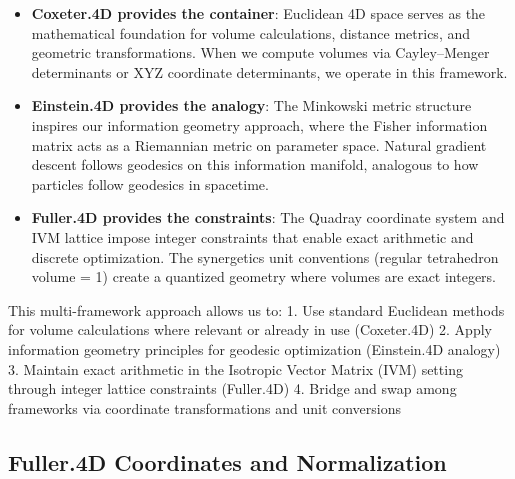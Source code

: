 \documentclass[
  10pt,
]{article}
\begin{document}
\begin{itemize}
\item
  \textbf{Coxeter.4D provides the container}: Euclidean 4D space serves
  as the mathematical foundation for volume calculations, distance
  metrics, and geometric transformations. When we compute volumes via
  Cayley--Menger determinants or XYZ coordinate determinants, we operate
  in this framework.
\item
  \textbf{Einstein.4D provides the analogy}: The Minkowski metric
  structure inspires our information geometry approach, where the Fisher
  information matrix acts as a Riemannian metric on parameter space.
  Natural gradient descent follows geodesics on this information
  manifold, analogous to how particles follow geodesics in spacetime.
\item
  \textbf{Fuller.4D provides the constraints}: The Quadray coordinate
  system and IVM lattice impose integer constraints that enable exact
  arithmetic and discrete optimization. The synergetics unit conventions
  (regular tetrahedron volume = 1) create a quantized geometry where
  volumes are exact integers.
\end{itemize}

This multi-framework approach allows us to: 1. Use standard Euclidean
methods for volume calculations where relevant or already in use
(Coxeter.4D) 2. Apply information geometry principles for geodesic
optimization (Einstein.4D analogy)\\
3. Maintain exact arithmetic in the Isotropic Vector Matrix (IVM)
setting through integer lattice constraints (Fuller.4D) 4. Bridge and
swap among frameworks via coordinate transformations and unit
conversions

\hypertarget{fuller.4d-coordinates-and-normalization}{%
\subsection{Fuller.4D Coordinates and
Normalization}\label{fuller.4d-coordinates-and-normalization}}
\end{document}
